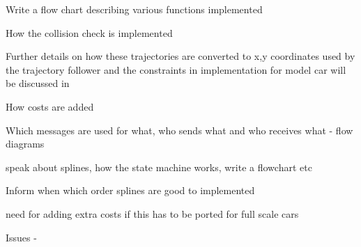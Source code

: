 Write a flow chart describing various functions implemented 

How the collision check is implemented

Further details on how these trajectories are converted to x,y coordinates used by the trajectory follower and the constraints in implementation for model car will be discussed in

How costs are added

Which messages are used for what, who sends what and who receives what - flow diagrams

speak about splines, how the state machine works, write a flowchart etc

Inform when which order splines are good to implemented

need for adding extra costs if this has to be ported for full scale cars

Issues - 
\fi